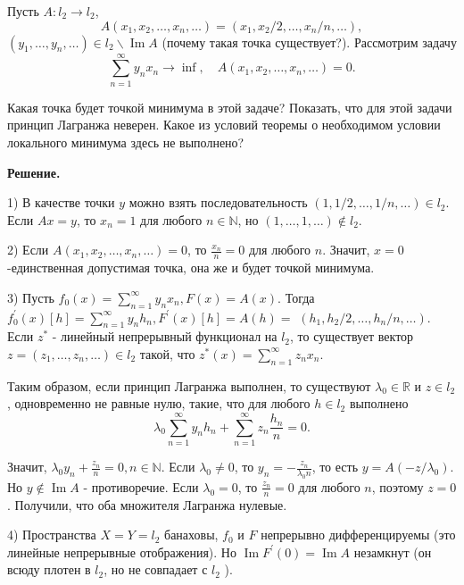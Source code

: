 \begin{task}
Пусть $A: l_2 \rightarrow l_2$,
$$
A\left(x_1, x_2, \ldots, x_n, \ldots\right)=\left(x_1, x_2 / 2, \ldots, x_n / n, \ldots\right),
$$
$\left(y_1, \ldots, y_n, \ldots\right) \in l_2 \backslash \operatorname{Im} A$ (почему такая точка существует?). Рассмотрим задачу
$$
\sum_{n=1}^{\infty} y_n x_n \rightarrow \inf , \quad A\left(x_1, x_2, \ldots, x_n, \ldots\right)=0 .
$$

Какая точка будет точкой минимума в этой задаче? Показать, что для этой задачи принцип Лагранжа неверен. Какое из условий теоремы о необходимом условии локального минимума здесь не выполнено?
\vspace{1cm}

\textbf{Решение.} 

1) В качестве точки $y$ можно взять последовательность 
$(1,1 / 2, \ldots, 1 / n, \ldots) \in l_2$. Если $A x=y$, то $x_n=1$ для любого $n \in \mathbb{N}$, но $(1, \ldots, 1, \ldots) \notin l_2$.
\vspace{0.5cm}

2) Если $A\left(x_1, x_2, \ldots, x_n, \ldots\right)=0$, то $\frac{x_n}{n}=0$ для любого $n$. Значит, $x=0$-единственная допустимая точка, она же и будет точкой минимума.
\vspace{0.5cm}

3) Пусть $f_0(x)=\sum_{n=1}^{\infty} y_n x_n, F(x)=A(x)$. Тогда $f_0^{\prime}(x)[h]=\sum_{n=1}^{\infty} y_n h_n, F^{\prime}(x)[h]=A(h)=$ $\left(h_1, h_2 / 2, \ldots, h_n / n, \ldots\right)$. Если $z^*$ - линейный непрерывный функционал на $l_2$, то существует вектор $z=\left(z_1, \ldots, z_n, \ldots\right) \in l_2$ такой, что $z^*(x)=\sum_{n=1}^{\infty} z_n x_n$.

Таким образом, если принцип Лагранжа выполнен, то существуют $\lambda_0 \in \mathbb{R}$ и $z \in l_2$, одновременно не равные нулю, такие, что для любого $h \in l_2$ выполнено
$$
\lambda_0 \sum_{n=1}^{\infty} y_n h_n+\sum_{n=1}^{\infty} z_n \frac{h_n}{n}=0 .
$$

Значит, $\lambda_0 y_n+\frac{z_n}{n}=0, n \in \mathbb{N}$. Если $\lambda_0 \neq 0$, то $y_n=-\frac{z_n}{\lambda_0 n}$, то есть $y=A\left(-z / \lambda_0\right)$. Но $y \notin \operatorname{Im} A$ - противоречие. Если $\lambda_0=0$, то $\frac{z_n}{n}=0$ для любого $n$, поэтому $z=0$. Получили, что оба множителя Лагранжа нулевые.
\vspace{0.5cm}

4) Пространства $X=Y=l_2$ банаховы, $f_0$ и $F$ непрерывно дифференцируемы (это линейные непрерывные отображения). Но $\operatorname{Im} F^{\prime}(0)=\operatorname{Im} A$ незамкнут (он всюду плотен в $l_2$, но не совпадает с $l_2$ ).

\end{task}
